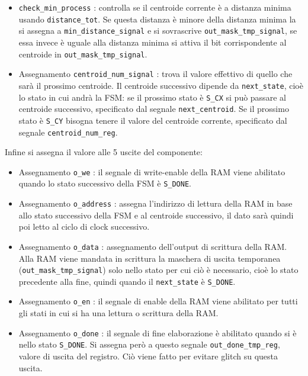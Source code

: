 \documentclass{article}
\begin{document}
\begin{itemize}
    \item \verb^check_min_process^ : controlla se il centroide corrente è a distanza minima usando \verb^distance_tot^. Se questa distanza è minore della distanza minima la si assegna a \verb^min_distance_signal^ e si sovrascrive \verb^out_mask_tmp_signal^, se essa invece è uguale alla distanza minima si attiva il bit corrispondente al centroide in \verb^out_mask_tmp_signal^.
    \item Assegnamento \verb^centroid_num_signal^ : trova il valore effettivo di quello che sarà il prossimo centroide. Il centroide successivo dipende da \verb^next_state^, cioè lo stato in cui andrà la FSM: se il prossimo stato è \verb^S_CX^ si può passare al centroide successivo, specificato dal segnale \verb^next_centroid^. Se il prossimo stato è \verb^S_CY^ bisogna tenere il valore del centroide corrente, specificato dal segnale \verb^centroid_num_reg^.
\end{itemize}
Infine si assegna il valore alle 5 uscite del componente:
\begin{itemize}
    \item Assegnamento \verb^o_we^ : il segnale di write-enable della RAM viene abilitato quando lo stato successivo della FSM è \verb^S_DONE^.
    \item Assegnamento \verb^o_address^ : assegna l'indirizzo di lettura della RAM in base allo stato successivo della FSM e al centroide successivo, il dato sarà quindi poi letto al ciclo di clock successivo.
    \item Assegnamento \verb^o_data^ : assegnamento dell'output di scrittura della RAM. Alla RAM viene mandata in scrittura la maschera di uscita temporanea (\verb^out_mask_tmp_signal^) solo nello stato per cui ciò è necessario, cioè lo stato precedente alla fine, quindi quando il \verb^next_state^ è \verb^S_DONE^.
    \item Assegnamento \verb^o_en^ : il segnale di enable della RAM viene abilitato per tutti gli stati in cui si ha una lettura o scrittura della RAM.
    \item Assegnamento \verb^o_done^ : il segnale di fine elaborazione è abilitato quando si è nello stato \verb^S_DONE^. Si assegna però a questo segnale \verb^out_done_tmp_reg^, valore di uscita del registro. Ciò viene fatto per evitare glitch su questa uscita.
\end{itemize}


\pagebreak
\end{document}
